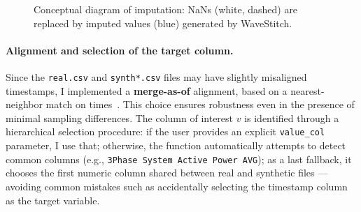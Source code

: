 \begin{figure}[H]
\centering
{}
\caption{Conceptual diagram of imputation: NaNs (white, dashed) are replaced by imputed values (blue) generated by WaveStitch.}
\label{fig:imputation_schema}
\end{figure}

\paragraph{Alignment and selection of the target column.}
Since the \texttt{real.csv} and \texttt{synth*.csv} files may have slightly misaligned timestamps, I implemented a \textbf{merge-as-of} alignment, based on a nearest-neighbor match on times~\cite{han2011data}.  
This choice ensures robustness even in the presence of minimal sampling differences.  
The column of interest $v$ is identified through a hierarchical selection procedure:  
if the user provides an explicit \texttt{value\_col} parameter, I use that;  
otherwise, the function automatically attempts to detect common columns (e.g., \texttt{3Phase System Active Power AVG});  
as a last fallback, it chooses the first numeric column shared between real and synthetic files — avoiding common mistakes such as accidentally selecting the timestamp column as the target variable.

